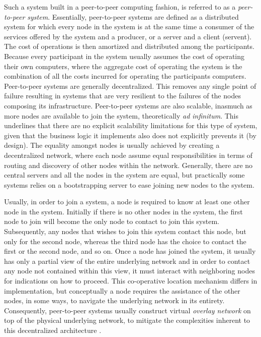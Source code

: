 \documentclass[12pt, titlepage]{uo_temp}
\begin{document}
     Such a system built in a peer-to-peer computing fashion, is referred to as a
     \emph{peer-to-peer system}.
     Essentially, peer-to-peer systems are defined as a distributed system for which every
     node in the system is at the same time a consumer of the services offered by the
     system and a producer, or a server and a client (servent). The cost of operations is
     then amortized and distributed among the participants. Because every participant in
     the system usually assumes the cost of operating their own computers, where the
     aggregate cost of operating the system is the combination of all the costs incurred
     for operating the participants computers. Peer-to-peer systems are generally
     decentralized. This removes any single point of failure resulting in systems that are
     very resilient to the failures of the nodes composing its
     infrastructure. Peer-to-peer systems are also scalable, inasmuch as more nodes are
     available to join the system, theoretically \emph{ad infinitum}. This underlines that
     there are no explicit scalability limitations for this type of system, given that the
     business logic it implements also does not explicitly prevents it (by design).
     The equality amongst nodes is usually achieved by creating a decentralized network,
     where each node assume equal responsibilities in terms of routing and discovery of
     other nodes within the network. Generally, there are no central servers and all the
     nodes in the system are equal, but practically some systems relies on a bootstrapping
     server to ease joining new nodes to the system.

     Usually, in order to join a system, a node is required to know at least one other
     node in the system. Initially if there is no other nodes in the system, the first
     node to join will become the only node to contact to join this system.
     Subsequently, any nodes that wishes to join this system contact this node, but only
     for the second node, whereas the third node has the choice to contact the first or
     the second node, and so on.
     Once a node has joined the system, it usually has only a partial view of the entire
     underlying network and in order to contact any node not contained within this view,
     it must interact with neighboring nodes for indications on how to proceed.  This
     co-operative location mechanism differs in implementation, but conceptually a node
     requires the assistance of the other nodes, in some ways, to navigate the underlying
     network in its entirety. Consequently, peer-to-peer systems usually construct
     virtual \emph{overlay network} on top of the physical underlying network, to mitigate
     the complexities inherent to this decentralized architecture \cite{milojicic2002peer}
     \cite{barkai2001peer}.
\end{document}
